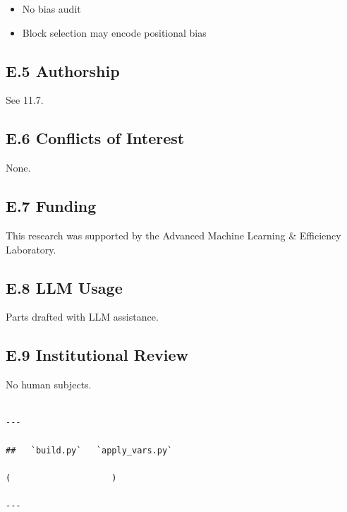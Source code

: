 \begin{itemize}
\item No bias audit
\item Block selection may encode positional bias

\end{itemize}
\subsection{E.5 Authorship}

See  11.7.

\subsection{E.6 Conflicts of Interest}

None.

\subsection{E.7 Funding}

This research was supported by the Advanced Machine Learning & Efficiency Laboratory.

\subsection{E.8 LLM Usage}

Parts drafted with LLM assistance.

\subsection{E.9 Institutional Review}

No human subjects.
\begin{lstlisting}

---

##   `build.py`   `apply_vars.py`

(                    )

---
\end{lstlisting}